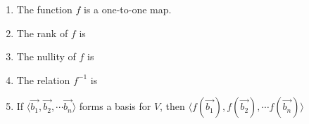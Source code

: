 \documentclass[11pt,fleqn]{article}
\begin{document}
\begin{enumerate}
	\begin{enumerate}
	\item The function $f$ is a one-to-one map.\\
	
	\item The rank of $f$ is\\
	
	\item The nullity of $f$ is\\
	
	\item The relation $f^{-1}$ is\\
	
	\item If $\langle \vec{b_1}, \vec{b_2}, \cdots \vec{b_n}\rangle$ forms a basis for $V$, then $\langle f(\vec{b_1}), f(\vec{b_2}), \cdots f(\vec{b_n})\rangle$\\
	
		\end{enumerate}
\end{enumerate}
\end{document}
